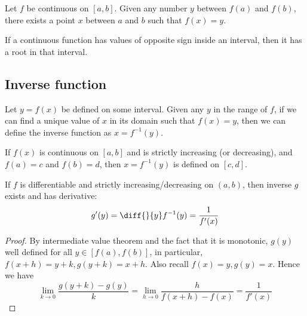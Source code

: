 \documentclass[11pt]{article}
\begin{document}
\begin{theorem}
  Let \(f\) be continuous on \([a,b]\). Given any number \(y\) between \(f(a)\) and \(f(b)\), there exists a point \(x\) between \(a\) and \(b\) such that \(f(x)=y\).
\end{theorem}

\begin{corollary}
  If a continuous function has values of opposite sign inside an interval, then it has a root in that interval.
\end{corollary}

\subsection{Inverse function}
\begin{definition}
  Let \(y=f(x)\) be defined on some interval. Given any \(y\) in the range of \(f\), if we can find a unique value of \(x\) in its domain such that \(f(x)=y\), then we can define the inverse function as \(x=f^{-1}(y)\).
\end{definition}

\begin{proposition}
  If \(f(x)\) is continuous on \([a,b]\) and is strictly increasing (or decreasing), and \(f(a)=c\) and \(f(b)=d\), then \(x=f^{-1}(y)\) is defined on \([c,d]\).
\end{proposition}

\begin{proposition}
  If \(f\) is differentiable and strictly increasing/decreasing on \((a,b)\), then inverse \(g\) exists and has derivative:
  \begin{equation*}
    g'(y)=\diff{}{y}f^{-1}(y)=\frac{1}{f'(x)}
  \end{equation*}
\end{proposition}
\begin{proof}
  By intermediate value theorem and the fact that it is monotonic, \(g(y)\) well defined for all \(y\in [f(a),f(b)]\), in particular, \(f(x+h)=y+k, g(y+k)=x+h\). Also recall \(f(x)=y, g(y)=x\). Hence we have 
  \[\lim_{k\to 0}\frac{g(y+k)-g(y)}{k} = \lim_{h\to 0}\frac{h}{f(x+h)-f(x)}=\frac{1}{f'(x)}\]
\end{proof}
\end{document}
